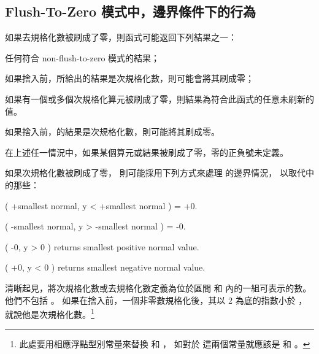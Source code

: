 \subsection[section:ftzmECB]{Flush-To-Zero 模式中，邊界條件下的行為}

如果去規格化數被刷成了零，則函式可能返回下列結果之一：
\startigNum
\item[item:nftz]任何符合 non-flush-to-zero 模式的結果；

\item 如果捨入前，所給出的結果是次規格化數，則可能會將其刷成零；

\item[item:nfcr] 如果有一個或多個次規格化算元被刷成了零，則結果為符合此函式的任意未刷新的值。

\item 如果捨入前，的結果是次規格化數，則可能將其刷成零。
\stopigNum

在上述任一情況中，如果某個算元或結果被刷成了零，零的正負號未定義。

如果次規格化數被刷成了零，
則可能採用下列方式來處理  的邊界情況，
以取代中的那些：

\startEnglishWithoutWhiteSpace
\setupnarrower[left=2em,right=0em]
 ( +smallest normal, y < +smallest normal ) = +0.\par
{} ( -smallest normal, y > -smallest normal ) = -0.\par
{} ( -0, y > 0 ) returns smallest positive normal value.\par
{} ( +0, y < 0 ) returns smallest negative normal value.\par
\stopnarrower
\stopEnglishWithoutWhiteSpace

清晰起見，將次規格化數或去規格化數定義為位於區間 
和  內的一組可表示的數。
他們不包括 。
如果在捨入前，一個非零數規格化後，其以 2 為底的指數小於 ，
就說他是次規格化數。\footnote{%
此處要用相應浮點型別常量來替換  和 ，
如對於  這兩個常量就應該是  和 。}

